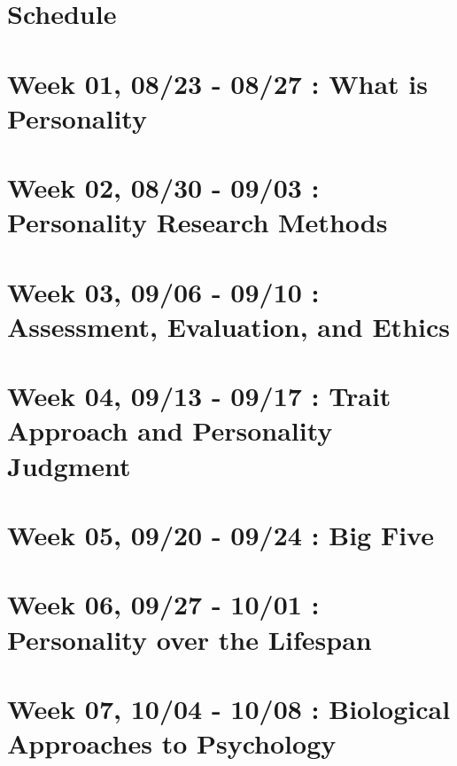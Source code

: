 \hypertarget{schedule}{%
\section{Schedule}\label{schedule}}

\hypertarget{week-01-0823---0827-what-is-personality}{%
\section*{Week 01, 08/23 - 08/27 : What is Personality}\label{week-01-0823---0827-what-is-personality}}


\hypertarget{week-02-0830---0903-personality-research-methods}{%
\section*{Week 02, 08/30 - 09/03 : Personality Research Methods}\label{week-02-0830---0903-personality-research-methods}}


\hypertarget{week-03-0906---0910-assessment-evaluation-and-ethics}{%
\section*{Week 03, 09/06 - 09/10 : Assessment, Evaluation, and Ethics}\label{week-03-0906---0910-assessment-evaluation-and-ethics}}


\hypertarget{week-04-0913---0917-trait-approach-and-personality-judgment}{%
\section*{Week 04, 09/13 - 09/17 : Trait Approach and Personality Judgment}\label{week-04-0913---0917-trait-approach-and-personality-judgment}}


\hypertarget{week-05-0920---0924-big-five}{%
\section*{Week 05, 09/20 - 09/24 : Big Five}\label{week-05-0920---0924-big-five}}


\hypertarget{week-06-0927---1001-personality-over-the-lifespan}{%
\section*{Week 06, 09/27 - 10/01 : Personality over the Lifespan}\label{week-06-0927---1001-personality-over-the-lifespan}}


\hypertarget{week-07-1004---1008-biological-approaches-to-psychology}{%
\section*{Week 07, 10/04 - 10/08 : Biological Approaches to Psychology}\label{week-07-1004---1008-biological-approaches-to-psychology}}


